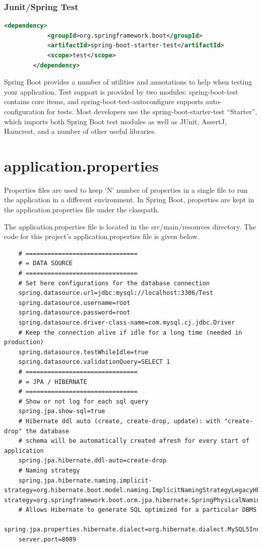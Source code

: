 \documentclass{report}
\begin{document}
	\subsubsection{Junit/Spring Test}
		\begin{lstlisting}[language=xml]
		<dependency>
			<groupId>org.springframework.boot</groupId>
			<artifactId>spring-boot-starter-test</artifactId>
			<scope>test</scope>
		</dependency>
		\end{lstlisting}
		Spring Boot provides a number of utilities and annotations to help when testing your 	application. Test support is provided by two modules: spring-boot-test contains core 	items, and spring-boot-test-autoconfigure supports auto-configuration for tests.
		Most developers use the spring-boot-starter-test “Starter”, which imports both 	Spring Boot test modules as well as JUnit, AssertJ, Hamcrest, and a number of other useful 	libraries.	
	\newpage
	\section{application.properties}
	Properties files are used to keep ‘N’ number of properties in a single file to run the application in a different environment. In Spring Boot, properties are kept in the application.properties file under the classpath.
	\par The application.properties file is located in the src/main/resources directory. The code for this project’s application.properties file is given below.
	\begin{lstlisting}
	# ===============================
	# = DATA SOURCE
	# ===============================
	# Set here configurations for the database connection
	spring.datasource.url=jdbc:mysql://localhost:3306/Test
	spring.datasource.username=root
	spring.datasource.password=root
	spring.datasource.driver-class-name=com.mysql.cj.jdbc.Driver
	# Keep the connection alive if idle for a long time (needed in production)
	spring.datasource.testWhileIdle=true
	spring.datasource.validationQuery=SELECT 1
	# ===============================
	# = JPA / HIBERNATE
	# ===============================
	# Show or not log for each sql query
	spring.jpa.show-sql=true
	# Hibernate ddl auto (create, create-drop, update): with "create-drop" the database
	# schema will be automatically created afresh for every start of application
	spring.jpa.hibernate.ddl-auto=create-drop
	# Naming strategy
	spring.jpa.hibernate.naming.implicit-strategy=org.hibernate.boot.model.naming.ImplicitNamingStrategyLegacyHbmImplspring.jpa.hibernate.naming.physical-strategy=org.springframework.boot.orm.jpa.hibernate.SpringPhysicalNamingStrategy
	# Allows Hibernate to generate SQL optimized for a particular DBMS
	spring.jpa.properties.hibernate.dialect=org.hibernate.dialect.MySQL5InnoDBDialect
	server.port=8089
	\end{lstlisting}
\end{document}
